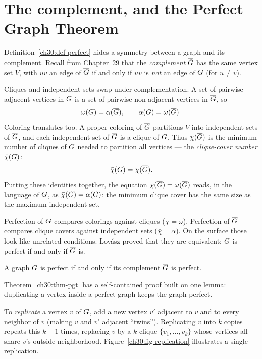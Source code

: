 \section{The complement, and the Perfect Graph Theorem}

Definition~\ref{ch30:def-perfect} hides a symmetry between a graph and its complement. Recall from Chapter~29 that the \emph{complement} $\overline{G}$ has the same vertex set $V$, with $uv$ an edge of $\overline{G}$ if and only if $uv$ is \emph{not} an edge of $G$ (for $u\neq v$).

Cliques and independent sets swap under complementation. A set of pairwise-adjacent vertices in $G$ is a set of pairwise-non-adjacent vertices in $\overline{G}$, so
\[
  \omega(G)=\alpha(\overline{G}),\qquad \alpha(G)=\omega(\overline{G}).
\]
Coloring translates too. A proper coloring of $\overline{G}$ partitions $V$ into independent sets of $\overline{G}$, and each independent set of $\overline{G}$ is a clique of $G$. Thus $\chi(\overline{G})$ is the minimum number of cliques of $G$ needed to partition all vertices --- the \emph{clique-cover number} $\bar\chi(G)$:
\[
  \bar\chi(G)=\chi(\overline{G}).
\]
Putting these identities together, the equation $\chi(\overline{G})=\omega(\overline{G})$ reads, in the language of $G$, as $\bar\chi(G)=\alpha(G)$: the minimum clique cover has the same size as the maximum independent set.

\begin{intuitionbox}
Perfection of $G$ compares colorings against cliques ($\chi=\omega$). Perfection of $\overline{G}$ compares clique covers against independent sets ($\bar\chi=\alpha$). On the surface those look like unrelated conditions. Lov\'asz proved that they are equivalent: $G$ is perfect if and only if $\overline{G}$ is.
\end{intuitionbox}

\begin{theorem}\label{ch30:thm-pgt}
A graph $G$ is perfect if and only if its complement $\overline{G}$ is perfect.
\end{theorem}

Theorem~\ref{ch30:thm-pgt} has a self-contained proof built on one lemma: duplicating a vertex inside a perfect graph keeps the graph perfect.

\begin{definition}\label{ch30:def-replication}
To \emph{replicate} a vertex $v$ of $G$, add a new vertex $v'$ adjacent to $v$ and to every neighbor of $v$ (making $v$ and $v'$ adjacent ``twins''). Replicating $v$ into $k$ copies repeats this $k-1$ times, replacing $v$ by a $k$-clique $\{v_1,\dots,v_k\}$ whose vertices all share $v$'s outside neighborhood. Figure~\ref{ch30:fig-replication} illustrates a single replication.
\end{definition}

